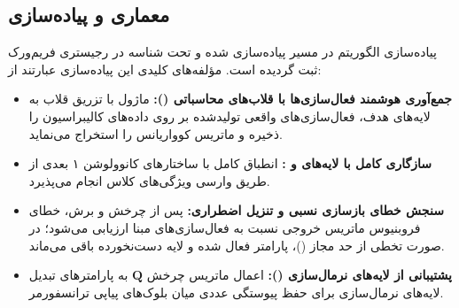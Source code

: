 \subsection{معماری و پیاده‌سازی}
پیاده‌سازی الگوریتم  در مسیر  پیاده‌سازی شده و تحت شناسه  در رجیستری فریم‌ورک ثبت گردیده است. مؤلفه‌های کلیدی این پیاده‌سازی عبارتند از:
\begin{itemize}
    \item \textbf{جمع‌آوری هوشمند فعال‌سازی‌ها با قلاب‌های محاسباتی ():} ماژول با تزریق قلاب به لایه‌های هدف، فعال‌سازی‌های واقعی تولیدشده بر روی داده‌های کالیبراسیون را ذخیره و ماتریس کوواریانس را استخراج می‌نماید.
    \item \textbf{سازگاری کامل با لایه‌های  و :} انطباق کامل با ساختارهای کانوولوشن ۱ بعدی از طریق وارسی ویژگی‌های کلاس انجام می‌پذیرد.
    \item \textbf{سنجش خطای بازسازی نسبی و تنزیل اضطراری:} پس از چرخش و برش، خطای فروبنیوس ماتریس خروجی نسبت به فعال‌سازی‌های مبنا ارزیابی می‌شود؛ در صورت تخطی از حد مجاز ()، پارامتر  فعال شده و لایه دست‌نخورده باقی می‌ماند.
    \item \textbf{پشتیبانی از لایه‌های نرمال‌سازی ():} اعمال ماتریس چرخش $\mathbf{Q}$ به پارامترهای تبدیل لایه‌های نرمال‌سازی برای حفظ پیوستگی عددی میان بلوک‌های پیاپی ترانسفورمر.
\end{itemize}
